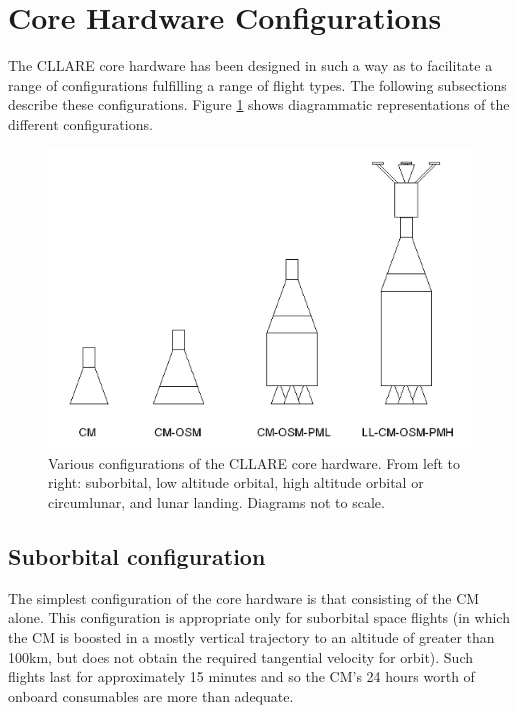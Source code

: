 \documentclass{report}
\begin{document}
\section{Core Hardware Configurations} \label{sec:config}

The CLLARE core hardware has been designed in such a way as to facilitate a range of configurations fulfilling a range of flight types.  The following subsections describe these configurations.  Figure \ref{fig:configs} shows diagrammatic representations of the different configurations.

\begin{figure}[h] \label{fig:configs}
\centering
\includegraphics[scale=0.6]{images/cllare_hardware_configs}
\caption{Various configurations of the CLLARE core hardware.  From left to right: suborbital, low altitude orbital, high altitude orbital or circumlunar, and lunar landing.  Diagrams not to scale.}
\end{figure}

\subsection{Suborbital configuration}

The simplest configuration of the core hardware is that consisting of the CM alone.  This configuration is appropriate only for suborbital space flights (in which the CM is boosted in a mostly vertical trajectory to an altitude of greater than 100km, but does not obtain the required tangential velocity for orbit).  Such flights last for approximately 15 minutes and so the CM's 24 hours worth of onboard consumables are more than adequate.
 
\end{document}
